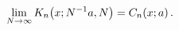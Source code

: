 \[\lim_{N\to\infty}\mathop{K_{n}\/}\nolimits\!\left(x;N^{-1}a,N\right)=\mathop{C%
_{n}\/}\nolimits\!\left(x;a\right).\]